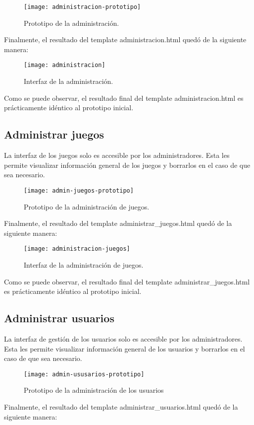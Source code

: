 \begin{figure}[htb]
\centering
\texttt{[image: administracion-prototipo]}
\caption{Prototipo de la administración.}
\label{fig:administracion-prototipo}
\end{figure}

Finalmente, el resultado del template administracion.html quedó de la siguiente manera:

\begin{figure}[htb]
\centering
\texttt{[image: administracion]}
\caption{Interfaz de la administración.}
\label{fig:administracion}
\end{figure}

Como se puede observar, el resultado final del template administracion.html es prácticamente idéntico al prototipo inicial. 

\subsection{Administrar juegos}
La interfaz de los juegos solo es accesible por los administradores. Esta les permite visualizar información general de los juegos y borrarlos en el caso de que sea necesario.

\begin{figure}[htb]
\centering
\texttt{[image: admin-juegos-prototipo]}
\caption{Prototipo de la administración de juegos.}
\label{fig:admin-juegos-prototipo}
\end{figure}

Finalmente, el resultado del template administrar\_juegos.html quedó de la siguiente manera:

\begin{figure}[htb]
\centering
\texttt{[image: administracion-juegos]}
\caption{Interfaz de la administración de juegos.}
\label{fig:administracion-juegos}
\end{figure}

Como se puede observar, el resultado final del template administrar\_juegos.html es prácticamente idéntico al prototipo inicial. 

\subsection{Administrar usuarios}
La interfaz de gestión de los usuarios solo es accesible por los administradores. Esta les permite visualizar información general de los usuarios y borrarlos en el caso de que sea necesario.
\begin{figure}[htb]
\centering
\texttt{[image: admin-ususarios-prototipo]}
\caption{Prototipo de la administración de los usuarios}
\label{fig:admin-ususarios-prototipo}
\end{figure}
Finalmente, el resultado del template administrar\_usuarios.html quedó de la siguiente manera:

